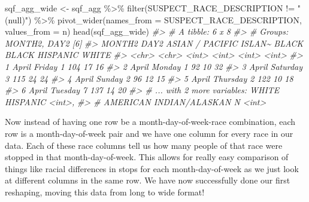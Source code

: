 \documentclass[
]{krantz}
\makeatletter
\newenvironment{Shaded}{\begin{snugshade}}{\end{snugshade}}
\newcommand{\AttributeTok}[1]{\textcolor[rgb]{0.61,0.61,0.61}{#1}}
\newcommand{\CommentTok}[1]{\textcolor[rgb]{0.37,0.37,0.37}{\textit{#1}}}
\newcommand{\FunctionTok}[1]{\textcolor[rgb]{0,0,0}{#1}}
\newcommand{\NormalTok}[1]{#1}
\newcommand{\OtherTok}[1]{\textcolor[rgb]{0.37,0.37,0.37}{#1}}
\newcommand{\SpecialCharTok}[1]{\textcolor[rgb]{0,0,0}{#1}}
\newcommand{\StringTok}[1]{\textcolor[rgb]{0.5,0.5,0.5}{#1}}
\newenvironment{kframe}{%
\medskip{}
\setlength{\fboxsep}{.8em}
 \def\at@end@of@kframe{}%
 \ifinner\ifhmode%
  \def\at@end@of@kframe{\end{minipage}}%
  \begin{minipage}{\columnwidth}%
 \fi\fi%
 \def\FrameCommand##1{\hskip\@totalleftmargin \hskip-\fboxsep
 \colorbox{shadecolor}{##1}\hskip-\fboxsep
     \hskip-\linewidth \hskip-\@totalleftmargin \hskip\columnwidth}%
 \MakeFramed {\advance\hsize-\width
   \@totalleftmargin\z@ \linewidth\hsize
   \@setminipage}}%
 {\par\unskip\endMakeFramed%
 \at@end@of@kframe}
\renewenvironment{Shaded}{\begin{kframe}}{\end{kframe}}
\makeatother
\begin{document}
\begin{Shaded}
\begin{Highlighting}[]
\NormalTok{sqf\_agg\_wide }\OtherTok{\textless{}{-}}\NormalTok{ sqf\_agg }\SpecialCharTok{\%\textgreater{}\%}
  \FunctionTok{filter}\NormalTok{(SUSPECT\_RACE\_DESCRIPTION }\SpecialCharTok{!=} \StringTok{"(null)"}\NormalTok{) }\SpecialCharTok{\%\textgreater{}\%}
  \FunctionTok{pivot\_wider}\NormalTok{(}\AttributeTok{names\_from =}\NormalTok{ SUSPECT\_RACE\_DESCRIPTION, }\AttributeTok{values\_from =}\NormalTok{ n) }
\FunctionTok{head}\NormalTok{(sqf\_agg\_wide)}
\CommentTok{\#\textgreater{} \# A tibble: 6 x 8}
\CommentTok{\#\textgreater{} \# Groups:   MONTH2, DAY2 [6]}
\CommentTok{\#\textgreater{}   MONTH2 DAY2     \textasciigrave{}ASIAN / PACIFIC ISLAN\textasciitilde{} BLACK \textasciigrave{}BLACK HISPANIC\textasciigrave{} WHITE}
\CommentTok{\#\textgreater{}   \textless{}chr\textgreater{}  \textless{}chr\textgreater{}                      \textless{}int\textgreater{} \textless{}int\textgreater{}            \textless{}int\textgreater{} \textless{}int\textgreater{}}
\CommentTok{\#\textgreater{} 1 April  Friday                         1   104               17    16}
\CommentTok{\#\textgreater{} 2 April  Monday                         1    92               10    32}
\CommentTok{\#\textgreater{} 3 April  Saturday                       3   115               24    24}
\CommentTok{\#\textgreater{} 4 April  Sunday                         2    96               12    15}
\CommentTok{\#\textgreater{} 5 April  Thursday                       2   122               10    18}
\CommentTok{\#\textgreater{} 6 April  Tuesday                        7   137               14    20}
\CommentTok{\#\textgreater{} \# ... with 2 more variables: WHITE HISPANIC \textless{}int\textgreater{},}
\CommentTok{\#\textgreater{} \#   AMERICAN INDIAN/ALASKAN N \textless{}int\textgreater{}}
\end{Highlighting}
\end{Shaded}

Now instead of having one row be a month-day-of-week-race combination, each row is a month-day-of-week pair and we have one column for every race in our data. Each of these race columns tell us how many people of that race were stopped in that month-day-of-week. This allows for really easy comparison of things like racial differences in stops for each month-day-of-week as we just look at different columns in the same row. We have now successfully done our first reshaping, moving this data from long to wide format!
\end{document}
